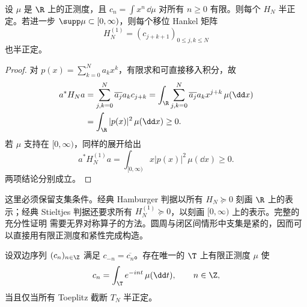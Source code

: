 \begin{proposition}\label{proposition:7-3-1-1}
设 $\mu$ 是 $\R$ 上的正测度，且 $c_n=\int x^n\,\dd\mu$ 对所有 $n\geq0$ 有限。则每个
$H_N$ 半正定。若进一步 $\supp\mu\subset[0,\infty)$，则每个移位 Hankel 矩阵
\[
 H_N^{(1)}=(c_{j+k+1})_{0\leq j,k\leq N}
\]
也半正定。
\end{proposition}

\begin{proof}
对 $p(x)=\sum_{k=0}^Na_kx^k$，有限求和可直接移入积分，故
\begin{align*}
 a^*H_Na
 &=\sum_{j,k=0}^N\overline{a_j}a_kc_{j+k}
   =\int_\R\sum_{j,k=0}^N\overline{a_j}a_kx^{j+k}\,\mu(\dd x)\\
 &=\int_\R|p(x)|^2\,\mu(\dd x)\geq0.
\end{align*}
若 $\mu$ 支持在 $[0,\infty)$，同样的展开给出
\[
 a^*H_N^{(1)}a=\int_{[0,\infty)}x|p(x)|^2\,\mu(\dd x)\geq0.
\]
两项结论分别成立。
\end{proof}

这里必须保留支集条件。经典 Hamburger 判据以所有 $H_N\succeq0$ 刻画 $\R$ 上的表示；经典
Stieltjes 判据还要求所有 $H_N^{(1)}\succeq0$，以刻画 $[0,\infty)$ 上的表示。完整的充分性证明
需要无界对称算子的方法。圆周与闭区间情形中支集是紧的，因而可以直接用有限正测度和紧性完成构造。

\begin{theorem}[Herglotz 表示]\label{theorem:7-3-1-2}
设双边序列 $(c_n)_{n\in\Z}$ 满足 $c_{-n}=\overline{c_n}$。存在唯一的 $\T$ 上有限正测度
$\mu$ 使
\[
 c_n=\int_\T e^{-int}\,\mu(\dd t),\qquad n\in\Z,
\]
当且仅当所有 Toeplitz 截断 $T_N$ 半正定。
\end{theorem}

